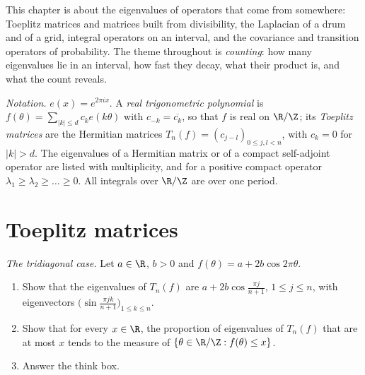 This chapter is about the eigenvalues of operators that come from somewhere: Toeplitz matrices and matrices built from divisibility, the Laplacian of
a drum and of a grid, integral operators on an interval, and the covariance and transition operators of probability. The theme throughout is
\emph{counting}: how many eigenvalues lie in an interval, how fast they decay, what their product is, and what the count reveals.

\begin{center}
\end{center}

\emph{Notation.} $e(x)=e^{2\pi ix}$. A \emph{real trigonometric polynomial} is $f(\theta)=\sum_{|k|\le d}c_ke(k\theta)$ with $c_{-k}=\overline{c_k}$, so that $f$ is real on $\R/\Z$;
its \emph{Toeplitz matrices} are the Hermitian matrices $T_n(f)=(c_{j-l})_{0\le j,l<n}$, with $c_k=0$ for $|k|>d$. The eigenvalues of a Hermitian matrix or of a compact
self-adjoint operator are listed with multiplicity, and for a positive compact operator $\lambda_1\ge\lambda_2\ge\dots\ge0$. All integrals over $\R/\Z$ are over one period.

\section{Toeplitz matrices}

\begin{exercise}[$\star$]\label{pb:tridiag}
\emph{The tridiagonal case.} Let $a\in\R$, $b>0$ and $f(\theta)=a+2b\cos2\pi\theta$.
\begin{enumerate}[label=(\alph*)]
\item Show that the eigenvalues of $T_n(f)$ are $a+2b\cos\frac{\pi j}{n+1}$, $1\le j\le n$, with eigenvectors $\bigl(\sin\frac{\pi jk}{n+1}\bigr)_{1\le k\le n}$.
\item Show that for every $x\in\R$, the proportion of eigenvalues of $T_n(f)$ that are at most $x$ tends to the measure of $\{\theta\in\R/\Z:f(\theta)\le x\}$.
\item Answer the think box.
\end{enumerate}
\end{exercise}

